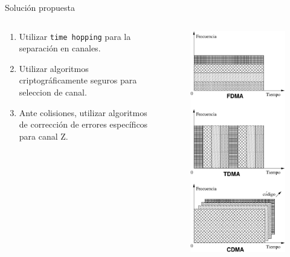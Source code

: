 \documentclass[aspectratio=169]{beamer}
\begin{document}

\begin{frame}{Solución propuesta}
\begin{columns}
  \begin{column}{0.60\textwidth}

\begin{enumerate}
 \item Utilizar \texttt{time hopping} para la separación en canales.
 \item Utilizar algoritmos criptográficamente seguros para seleccion de canal.
 \item Ante colisiones, utilizar algoritmos de corrección de errores específicos para canal Z.
 \end{enumerate}

  \end{column}
  \begin{column}{0.40\textwidth}

 
\begin{figure}[t]
  \centering
  \includegraphics[width=0.55 \textwidth]{../graphs/tdmacdma} 
  \label{fig_tdmacdma}
\end{figure}

  \end{column}
\end{columns}

\end{frame}
\end{document}
